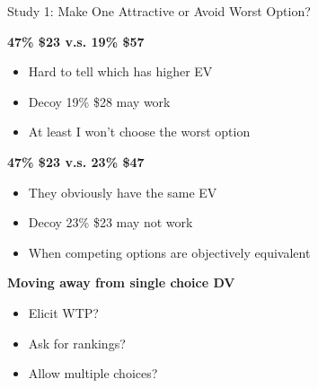 \documentclass[
  ignorenonframetext,
  aspectratio=169]{beamer}
\begin{document}
\begin{frame}{Study 1: Make One Attractive or Avoid Worst Option?}
\label{study-1-make-one-attractive-or-avoid-worst-option}
\begin{flushleft}
  \textbf{47\% \$23 v.s. 19\% \$57}
  \begin{itemize}
    \item Hard to tell which has higher EV
    \item Decoy 19\% \$28 may work
    \item At least I won't choose the worst option
  \end{itemize}
\end{flushleft}

\pause
\begin{flushleft}
  \textbf{47\% \$23 v.s. 23\% \$47}
  \begin{itemize}
    \item They obviously have the same EV
    \item Decoy 23\% \$23 may not work
    \item When competing options are objectively equivalent
  \end{itemize}
\end{flushleft}

\pause
\begin{flushleft}
  \textbf{Moving away from single choice DV}
  \begin{itemize}
    \item Elicit WTP?
    \item Ask for rankings?
    \item Allow multiple choices?
  \end{itemize}
\end{flushleft}
\end{frame}
\end{document}
